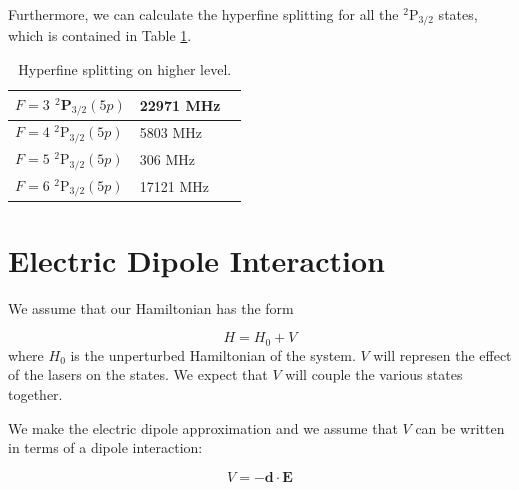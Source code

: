 Furthermore, we can calculate the hyperfine splitting for all the $^2$P$_{3/2}$ states, which is contained in Table \ref{tableOfHyperfine deetuings}.

\begin{table}[h]
\centering
\begin{tabular}{|l|l|||r|}
\hline
$F=3$ $^2$P$_{3/2} (5p)$ & 22971  MHz\\ \hline
$F=4$ $^2$P$_{3/2} (5p)$ &  5803 MHz\\ \hline
$F=5$ $^2$P$_{3/2} (5p)$ &  306 MHz\\ \hline
$F=6$ $^2$P$_{3/2} (5p)$ &   17121 MHz\\ \hline
\end{tabular}
\caption{Hyperfine splitting on higher level.}
\label{tableOfHyperfine deetuings}
\end{table}



\section{Electric Dipole Interaction}

We assume that our Hamiltonian has the form 

\begin{equation}
H=H_0+V
\end{equation}
where $H_0$ is the unperturbed Hamiltonian of the system. $V$ will represen the effect of the lasers on the states. We expect that $V$ will couple the various states together. 


We make the electric dipole approximation and we assume that $V$ can be written in terms of a dipole interaction:  \cite{demilleBudkerKimball}\cite{cuaMITnotes}\cite{gustavsonThesis}\cite{Young1997363}

\begin{equation}
V=-\mathbf{d}\cdot\mathbf{E}
\end{equation}

